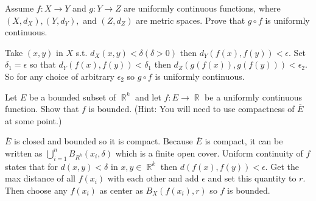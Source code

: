 \documentclass[12pt,letterpaper,boxed]{hmcpset}
\DeclareMathOperator{\R}{\mathbb{R}}
\begin{document}
\begin{problem}[Exercise 2.40]
Assume $f: X \rightarrow Y$ and $g: Y \rightarrow Z$ are uniformly continuous functions, where $(X, d_X), (Y, d_Y),$ and $(Z, d_Z)$ are metric spaces. Prove that $g \circ f$ is uniformly continuous.
\end{problem}

\begin{solution}
Take $(x, y)$ in $X$ s.t. $d_X(x, y) < \delta (\delta > 0)$ then $d_Y(f(x), f(y)) < \epsilon.$ Set $\delta_1 = \epsilon$ so that $d_Y(f(x), f(y))<\delta_1$ then $d_Z(g(f(x)),g(f(y))) < \epsilon_2$.
So for any choice of arbitrary $\epsilon_2$ so $g \circ f$ is uniformly continuous.
\end{solution}


\begin{problem}[Exercise 2.41]
Let $E$ be a bounded subset of $\R^{k}$ and let $f : E \rightarrow \R$ be a uniformly continuous function. Show that $f$ is bounded. (Hint: You will need to use compactness of $\overline{E}$ at some point.)
\end{problem}

\begin{solution}
$\overline{E}$ is closed and bounded so it is compact. Because $\overline{E}$ is compact, it can be written as $\bigcup_{i = 1}^{n} B_{R^{k}}(x_i, \delta)$ which is a finite open cover. Uniform continuity of $f$ states that for $d(x,y) < \delta$ in $x, y \in \R^{k}$ then $d(f(x), f(y)) < \epsilon.$ Get the max distance of all $f(x_i)$ with each other and add $\epsilon$ and set this quantity to $r$. Then choose any $f(x_i)$ as center as $B_X(f(x_i), r)$ so $f$ is bounded. 
\end{solution}
\end{document}
